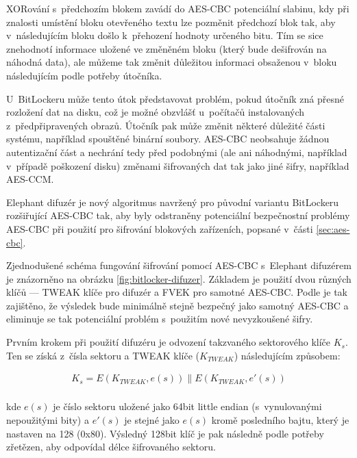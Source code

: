 XORování s~předchozím blokem zavádí do AES-CBC potenciální slabinu, kdy při znalosti umístění bloku otevřeného textu lze pozměnit předchozí blok tak, aby v~následujícím bloku došlo k~přehození hodnoty určeného bitu. Tím se sice znehodnotí informace uložené ve změněném bloku (který bude dešifrován na náhodná data), ale můžeme tak změnit důležitou informaci obsaženou v~bloku následujícím podle potřeby útočníka.\cite{Regalado2013}

U~BitLockeru může tento útok představovat problém, pokud útočník zná přesné roz\-lo\-že\-ní dat na disku, což je možné obzvlášť u~počítačů instalovaných z~předpřipravených obrazů. Útočník pak může změnit některé důležité části systému, například spouštěné binární soubory.\cite{Ferguson2006,Rosendorf2013} AES-CBC neobsahuje žádnou autentizační část a nechrání tedy před podobnými (ale ani náhodnými, například v~případě poškození disku) změnami šifrovaných dat tak jako jiné šifry, například AES-CCM.


Elephant difuzér je nový algoritmus navržený pro původní variantu BitLockeru rozšiřující AES-CBC tak, aby byly odstraněny potenciální bezpečnostní problémy AES-CBC při použití pro šifrování blokových zařízeních, popsané v~části \ref{sec:aes-cbc}\cite{Ferguson2006}.


Zjednodušené schéma fungování šifrování pomocí AES-CBC s~Elephant difuzérem je znázorněno na obrázku \ref{fig:bitlocker-difuzer}. Základem je použití dvou různých klíčů --- TWEAK klíče pro difuzér a FVEK pro samotné AES-CBC. Podle \cite{Ferguson2006} je tak zajištěno, že výsledek bude minimálně stejně bezpečný jako samotný AES-CBC a eliminuje se tak potenciální problém s~použitím nové nevyzkoušené šifry.

Prvním krokem při použití difuzéru je odvození takzvaného sektorového klíče $K_s$. Ten se získá z~čísla sektoru a TWEAK klíče ($K_{TWEAK}$) následujícím způsobem:

\begin{align}
K_s = E(K_{TWEAK}, e(s)) \parallel E(K_{TWEAK}, e'(s)) \\ \nonumber
\end{align}

kde $e(s)$ je číslo sektoru uložené jako 64bit little endian (s~vynulovanými nepoužitými bity) a $e'(s)$ je stejné jako $e(s)$ kromě posledního bajtu, který je nastaven na 128 (0x80). Výsledný 128bit klíč je pak následně podle potřeby zřetězen, aby odpovídal délce šifrovaného sektoru.\cite{Ferguson2006,Rosendorf2013,Kumar2008}

